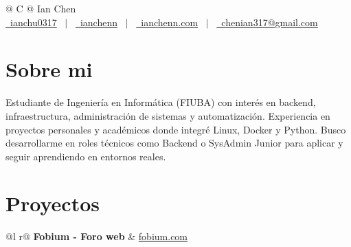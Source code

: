 \documentclass[a4paper,12pt]{article}
\begin{document}
\pagestyle{empty} 



\begin{tabularx}{\linewidth}{@{} C @{}}
\Huge{Ian Chen} \\[7.5pt]
\href{https://github.com/ianchu0317}{\raisebox{-0.05\height}\faGithub\ ianchu0317} \ $|$ \ 
\href{https://linkedin.com/in/ianchenn}{\raisebox{-0.05\height}\faLinkedin\ ianchenn} \ $|$ \ 
\href{https://ianchenn.com}{\raisebox{-0.05\height}\faGlobe \ ianchenn.com} \ $|$ \ 
\href{mailto:chenian317@gmail.com}{\raisebox{-0.05\height}\faEnvelope \ chenian317@gmail.com}  \\
\end{tabularx}


\section{Sobre mi}
Estudiante de Ingeniería en Informática (FIUBA) con interés en backend, infraestructura, administración de sistemas y automatización. Experiencia en proyectos personales y académicos donde integré Linux, Docker y Python. Busco desarrollarme en roles técnicos como Backend o SysAdmin Junior para aplicar y seguir aprendiendo en entornos reales.


\section{Proyectos}

\begin{tabularx}{\linewidth}{ @{}l r@{} }
\textbf{Fobium - Foro web} & \hfill \href{https://www.fobium.com}{fobium.com} \\[3.75pt]
  \\
\end{tabularx}
\end{document}
